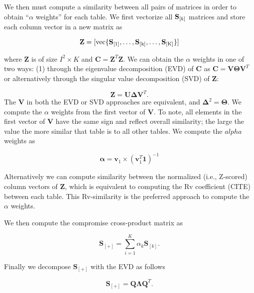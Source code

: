 \documentclass[man]{apa6}
\theoremstyle{definition}
\theoremstyle{definition}
\theoremstyle{definition}
\theoremstyle{remark}
\begin{document}
We then must compute a similarity between all pairs of matrices in order
to obtain \enquote{\(\alpha\) weights} for each table. We first
vectorize all \({\bf S}_{[k]}\) matrices and store each column vector in
a new matrix as

\begin{equation}
\mathbf{Z} = [ \mathrm{vec\{ {\bf S}_{[1]}, \dots, {\bf S}_{[k]}, \dots, {\bf S}_{[K]}   \}} ]
\end{equation}

where \(\mathbf{Z}\) is of size \(I^{2} \times K\) and
\(\mathbf{C} = \mathbf{Z}^{T}\mathbf{Z}\). We can obtain the \(\alpha\)
weights in one of two ways: (1) through the eigenvalue decomposition
(EVD) of \(\mathbf{C}\) as
\(\mathbf{C} = \mathbf{V}\boldsymbol{\Theta}\mathbf{V}^{T}\) or
alternatively through the singular value decomposition (SVD) of
\({\mathbf Z}\):

\begin{equation}
\mathbf{Z} = \mathbf{U}\boldsymbol{\Delta}\mathbf{V}^{T}.
\end{equation} The \(\mathbf{V}\) in both the EVD or SVD approaches are
equivalent, and \(\boldsymbol{\Delta}^2 = \boldsymbol{\Theta}\). We
compute the \(\alpha\) weights from the first vector of \(\mathbf{V}\).
To note, all elements in the first vector of \(\mathbf{V}\) have the
same sign and reflect overall similarity; the large the value the more
similar that table is to all other tables. We compute the \(alpha\)
weights as

\begin{equation}
\boldsymbol{\alpha} = \mathbf{v}_{1}  \times (\mathbf{v}_{1}^{T}\mathbf{1})^{-1}
\end{equation}

Alternatively we can compute similarity between the normalized (i.e.,
Z-scored) column vectors of \(\mathbf{Z}\), which is equivalent to
computing the Rv coefficient (CITE) between each table. This
Rv-similarity is the preferred approach to compute the \(\alpha\)
weights.

We then compute the compromise cross-product matrix as

\begin{equation}
\mathbf{S}_{[+]} = \sum\limits_{i=1}^K \alpha_{k}\mathbf{S}_{[k]}.
\end{equation}

Finally we decompose \(\mathbf{S}_{[+]}\) with the EVD as follows

\begin{equation}
\mathbf{S}_{[+]} = \mathbf{Q}\boldsymbol{\Lambda}\mathbf{Q}^{T}.
\end{equation}
\end{document}

